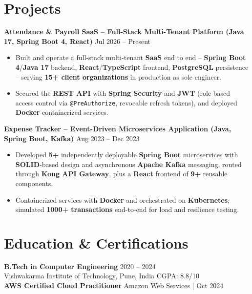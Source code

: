 \documentclass[a4paper,10pt]{article}
\begin{document}
\section*{Projects}

\textbf{Attendance \& Payroll SaaS -- Full-Stack Multi-Tenant Platform (Java 17, Spring Boot 4, React)} \hfill Jul 2026 -- Present
\begin{itemize}[leftmargin=*]
    \item Built and operate a full-stack multi-tenant \textbf{SaaS} end to end -- \textbf{Spring Boot 4}/\textbf{Java 17} backend, \textbf{React}/\textbf{TypeScript} frontend, \textbf{PostgreSQL} persistence -- serving \textbf{15+ client organizations} in production as sole engineer.
    \item Secured the \textbf{REST API} with \textbf{Spring Security} and \textbf{JWT} (role-based access control via \texttt{@PreAuthorize}, revocable refresh tokens), and deployed \textbf{Docker}-containerized services.
\end{itemize}

\textbf{Expense Tracker -- Event-Driven Microservices Application (Java, Spring Boot, Kafka)} \hfill Aug 2023 -- Dec 2023
\begin{itemize}[leftmargin=*]
    \item Developed \textbf{5+} independently deployable \textbf{Spring Boot} microservices with \textbf{SOLID}-based design and asynchronous \textbf{Apache Kafka} messaging, routed through \textbf{Kong API Gateway}, plus a \textbf{React} frontend of \textbf{9+} reusable components.
    \item Containerized services with \textbf{Docker} and orchestrated on \textbf{Kubernetes}; simulated \textbf{1000+ transactions} end-to-end for load and resilience testing.
\end{itemize}

\section*{Education \& Certifications}
\textbf{B.Tech in Computer Engineering} \hfill 2020 -- 2024 \\
Vishwakarma Institute of Technology, Pune, India \hfill CGPA: 8.8/10 \\
\textbf{AWS Certified Cloud Practitioner} \hfill Amazon Web Services \;|\; Oct 2024
\end{document}
